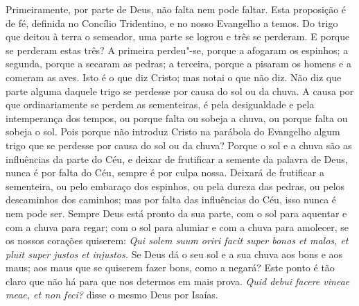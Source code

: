 Primeiramente, por parte de Deus, não falta nem pode faltar. Esta
proposição é de fé, definida no Concílio Tridentino, e no nosso
Evangelho a temos. Do trigo que deitou à terra o semeador, uma parte se
logrou e três se perderam. E porque se perderam estas três? A
primeira perdeu"-se, porque a afogaram os espinhos; a segunda, porque a
secaram as pedras; a terceira, porque a pisaram os homens e a comeram
as aves. Isto é o que diz Cristo; mas notai o que não diz. Não diz que
parte alguma daquele trigo se perdesse por causa do sol ou da chuva. A
causa por que ordinariamente se perdem as sementeiras, é pela
desigualdade e pela intemperança dos tempos, ou porque falta ou sobeja a
chuva, ou porque falta ou sobeja o sol. Pois porque não introduz Cristo
na parábola do Evangelho algum trigo que se perdesse por causa do sol ou
da chuva? Porque o sol e a chuva são as influências da parte do Céu,
e deixar de frutificar a semente da palavra de Deus, nunca é por falta
do Céu, sempre é por culpa nossa. Deixará de frutificar a sementeira, ou
pelo embaraço dos espinhos, ou pela dureza das pedras, ou pelos
descaminhos dos caminhos; mas por falta das influências do Céu, isso
nunca é nem pode ser. Sempre Deus está pronto da sua parte, com o sol
para aquentar e com a chuva para regar; com o sol para alumiar e com a
chuva para amolecer, se os nossos corações quiserem: \emph{Qui solem
suum oriri facit super bonos et malos, et pluit super justos et
injustos.} Se Deus dá o seu sol e a sua chuva aos
bons e aos maus; aos maus que se quiserem fazer bons, como a negará?
Este ponto é tão claro que não há para que nos determos em mais prova.
\emph{Quid debui facere vineae meae, et non feci?}
disse o mesmo Deus por Isaías.

